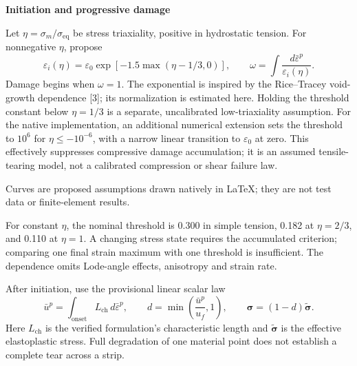 \documentclass[10pt,a4paper]{article}
\newcommand{\PageTitle}[1]{{\LARGE\bfseries\color{Navy}#1\par}\vspace{7pt}}
\begin{document}
\clearpage
\PageTitle{Initiation and progressive damage}
Let $\eta=\sigma_m/\sigma_{\mathrm{eq}}$ be stress triaxiality, positive in hydrostatic tension. For nonnegative $\eta$, propose
\[
\varepsilon_i(\eta)=\varepsilon_0
       \exp[-1.5\max(\eta-1/3,0)],
\qquad
\omega=\int\frac{d\bar\varepsilon^p}{\varepsilon_i(\eta)}.
\]
Damage begins when $\omega=1$. The exponential is inspired by the Rice--Tracey void-growth dependence [3]; its normalization is estimated here. Holding the threshold constant below $\eta=1/3$ is a separate, uncalibrated low-triaxiality assumption. For the native implementation, an additional numerical extension sets the threshold to $10^6$ for $\eta\le-10^{-6}$, with a narrow linear transition to $\varepsilon_0$ at zero. This effectively suppresses compressive damage accumulation; it is an assumed tensile-tearing model, not a calibrated compression or shear failure law.

\begin{center}
\end{center}
{\small Curves are proposed assumptions drawn natively in \LaTeX; they are not test data or finite-element results.}

For constant $\eta$, the nominal threshold is 0.300 in simple tension, 0.182 at $\eta=2/3$, and 0.110 at $\eta=1$. A changing stress state requires the accumulated criterion; comparing one final strain maximum with one threshold is insufficient. The dependence omits Lode-angle effects, anisotropy and strain rate.

After initiation, use the provisional linear scalar law
\[
\bar u^p=\int_{\mathrm{onset}} L_{\mathrm{ch}}\,d\bar\varepsilon^p,\qquad
d=\min\!\left(\frac{\bar u^p}{u_f},1\right),\qquad
\boldsymbol\sigma=(1-d)\widetilde{\boldsymbol\sigma}.
\]
Here $L_{\mathrm{ch}}$ is the verified formulation's characteristic length and $\widetilde{\boldsymbol\sigma}$ is the effective elastoplastic stress. Full degradation of one material point does not establish a complete tear across a strip.
\end{document}
